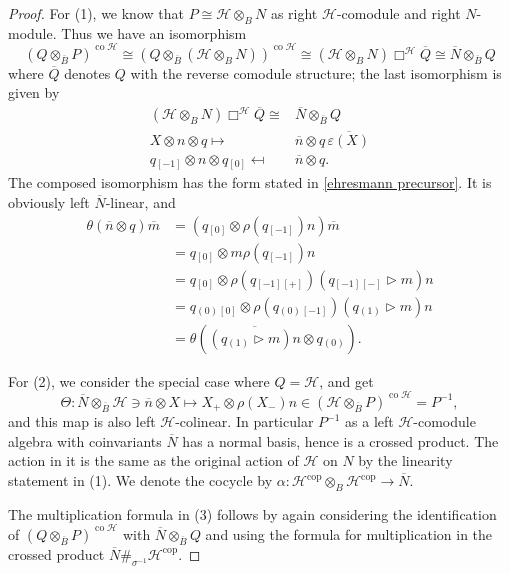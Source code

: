 \documentclass[a4paper,reqno]{amsart}
\numberwithin{equation}{section}
\theoremstyle{plain}
\theoremstyle{remark}
\numberwithin{equation}{section}
\newcommand\inv{^{-1}}
\newcommand{\ot}{\otimes}
\newcommand\ol{\overline}
\newcommand{\BB}{\overline{B}}
\newcommand{\z}{{}_{\scriptscriptstyle{(0)}}}
\newcommand{\rz}{{}_{\scriptscriptstyle{[0]}}}
\renewcommand{\o}{{}_{\scriptscriptstyle{(1)}}}
\newcommand{\rmo}{{}_{\scriptscriptstyle{[-1]}}}
\newcommand\ou[1]{\otimes_{#1}}
\newcommand{\la}{{\triangleright}}
\newcommand{\CH}{\mathcal{H}}
\newcommand\co{{\operatorname{co}}}
\newcommand\cop{{\operatorname{cop}}}
\begin{document}
\begin{proof}
 For (1),   we know that $P\cong \CH\ou BN$ as right $\CH$-comodule and right $N$-module. Thus we have an isomorphism 
    \[(Q\ou{\ol B}P)^{\co\CH} \cong (Q\ou{\ol B}(\CH\ou BN))^{\co\CH}\cong(\CH\ou BN)\Box^\CH \ol Q\cong \ol N\ou{\ol B}Q\]
    where $\ol Q$ denotes $Q$ with the reverse comodule structure; the last isomorphism is given by
    \begin{align*}
        (\CH\ou BN)\Box^\CH \ol Q\cong& \ol N\ou{\ol B}Q\\
        X\ot n\ot q\mapsto& \overline{n}\ot q\,\overline{\varepsilon(X)}\\
        q\rmo\ot n\ot q\rz\mapsfrom& \overline{n}\ot q.
    \end{align*}
    The composed isomorphism has the form stated in \eqref{ehresmann precursor}. It is obviously left $\ol N$-linear, and \begin{align*}\theta(\ol n\ot q)\ol m&=(q\rz\ot\rho(q\rmo)n)\ol m\\&=q\rz\ot m\rho(q\rmo)n
    \\&=q\rz\ot \rho(q\rmo{}_{[+]})(q\rmo{}_{[-]}\la m)n
    \\&=q\z\rz\ot\rho(q\z\rmo)(q\o\la m)n
    \\&=\theta(\ol{(q\o\la m)n}\ot q\z).
    \end{align*}

   For (2),     we consider the special case where $Q=\CH$, and get
    \[\Theta\colon \overline{N}\ou \BB\CH\ni \overline{n}\ot X\mapsto X_+\ot\rho(X_-)n\in (\CH\ou{\ol  B} P)^{\co \CH}=P\inv,\]
    and this map is also left $\CH$-colinear. In particular $P\inv$ as a left $\CH$-comodule algebra with coinvariants $\ol N$ has a normal basis, hence is a crossed product. The action in it is the same as the original action of $\CH$ on $N$ by the linearity statement in (1). We denote the cocycle by $\alpha:\CH^{\cop}\ot_{B} \CH^{\cop}\to \ol N$. 
    
 The multiplication formula in (3) follows by again considering the identification of $(Q\ou{\ol B}P)^{\co\CH}$ with $\ol N\ou{\ol B}Q $ and using the formula for multiplication in the crossed product $\ol N\#_{\sigma\inv}\CH^{\cop}$.
    



\end{proof}
\end{document}
